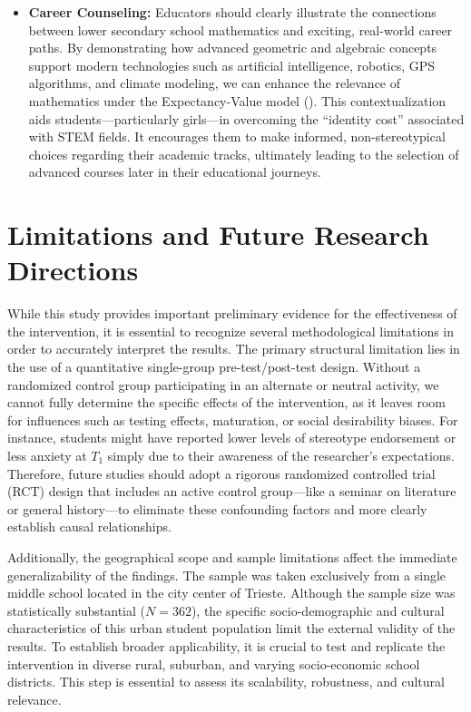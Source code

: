 \begin{itemize}
    \item \textbf{Career Counseling:} Educators should clearly illustrate the connections between lower secondary school mathematics and exciting, real-world career paths. By demonstrating how advanced geometric and algebraic concepts support modern technologies such as artificial intelligence, robotics, GPS algorithms, and climate modeling, we can enhance the relevance of mathematics under the Expectancy-Value model (\cite{EcclesWigfield2020}). This contextualization aids students—particularly girls—in overcoming the ``identity cost'' associated with STEM fields. It encourages them to make informed, non-stereotypical choices regarding their academic tracks, ultimately leading to the selection of advanced courses later in their educational journeys.
\end{itemize}

\section{Limitations and Future Research Directions}
While this study provides important preliminary evidence for the effectiveness of the intervention, it is essential to recognize several methodological limitations in order to accurately interpret the results. The primary structural limitation lies in the use of a quantitative single-group pre-test/post-test design. Without a randomized control group participating in an alternate or neutral activity, we cannot fully determine the specific effects of the intervention, as it leaves room for influences such as testing effects, maturation, or social desirability biases. For instance, students might have reported lower levels of stereotype endorsement or less anxiety at $T_1$ simply due to their awareness of the researcher's expectations. Therefore, future studies should adopt a rigorous randomized controlled trial (RCT) design that includes an active control group—like a seminar on literature or general history—to eliminate these confounding factors and more clearly establish causal relationships.

Additionally, the geographical scope and sample limitations affect the immediate generalizability of the findings. The sample was taken exclusively from a single middle school located in the city center of Trieste. Although the sample size was statistically substantial ($N = 362$), the specific socio-demographic and cultural characteristics of this urban student population limit the external validity of the results. To establish broader applicability, it is crucial to test and replicate the intervention in diverse rural, suburban, and varying socio-economic school districts. This step is essential to assess its scalability, robustness, and cultural relevance.

